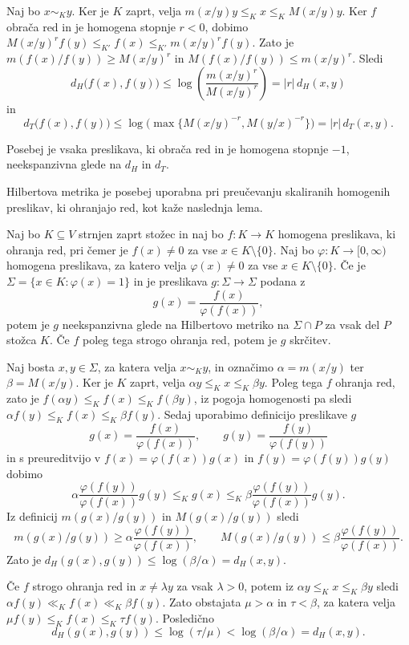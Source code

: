\documentclass[mat2, tisk]{fmfdelo}
\begin{document}
\begin{dokaz}
Naj bo $x\sim_K y$. Ker je $K$ zaprt, velja
$m(x/y)y\leq_K x\leq_K M(x/y)y$. Ker $f$ obrača red in je homogena
stopnje $r<0$, dobimo
$M(x/y)^r f(y)\leq_{K'}f(x)\leq_{K'}m(x/y)^r f(y)$.
Zato je $m(f(x)/f(y))\geq M(x/y)^r$ in
$M(f(x)/f(y))\leq m(x/y)^r$. Sledi
\[
d_H\bigl(f(x),f(y)\bigr)
\leq
\log\left(\frac{m(x/y)^r}{M(x/y)^r}\right)
=
|r|\,d_H(x,y)
\]
in
\[
d_T\bigl(f(x),f(y)\bigr)
\leq
\log\bigl(\max\{M(x/y)^{-r},M(y/x)^{-r}\}\bigr)
=
|r|\,d_T(x,y).
\]
\end{dokaz}

Posebej je vsaka preslikava, ki obrača red in je homogena stopnje
$-1$, neekspanzivna glede na $d_H$ in $d_T$.

Hilbertova metrika je posebej uporabna pri preučevanju skaliranih
homogenih preslikav, ki ohranjajo red, kot kaže naslednja lema.

\begin{lema}
Naj bo $K\subseteq V$ strnjen zaprt stožec in naj bo
$f:K\longrightarrow K$ homogena preslikava, ki ohranja red, pri čemer
je $f(x)\neq0$ za vse $x\in K\setminus\{0\}$. Naj bo
$\varphi:K\longrightarrow[0,\infty)$ homogena preslikava, za katero
velja $\varphi(x)\neq0$ za vse $x\in K\setminus\{0\}$. Če je
$\Sigma=\{x\in K:\varphi(x)=1\}$ in je preslikava
$g:\Sigma\longrightarrow\Sigma$ podana z
\[
g(x)=\frac{f(x)}{\varphi(f(x))},
\]
potem je $g$ neekspanzivna glede na Hilbertovo metriko na
$\Sigma\cap P$ za vsak del $P$ stožca $K$. Če $f$ poleg tega strogo
ohranja red, potem je $g$ skrčitev.
\end{lema}

\begin{dokaz}
Naj bosta $x,y\in\Sigma$, za katera velja $x\sim_K y$, in označimo
$\alpha=m(x/y)$ ter $\beta=M(x/y)$. Ker je $K$ zaprt, velja
$\alpha y\leq_K x\leq_K\beta y$. Poleg  tega $f$ ohranja red, zato je
$f(\alpha y)\leq_K f(x)\leq_K f(\beta y)$, iz pogoja homogenosti pa sledi
$\alpha f(y)\leq_K f(x)\leq_K\beta f(y)$. Sedaj uporabimo definicijo 
preslikave $g$ 
\[
g(x)=\frac{f(x)}{\varphi(f(x))},
\qquad
g(y)=\frac{f(y)}{\varphi(f(y))}
\]
in s preureditvijo v $f(x)= \varphi(f(x)) g(x)$ in $f(y)= \varphi(f(y)) g(y)$ dobimo
\[
\alpha\frac{\varphi(f(y))}{\varphi(f(x))}g(y)
\leq_K g(x)
\leq_K
\beta\frac{\varphi(f(y))}{\varphi(f(x))}g(y).
\]
Iz definicij $m(g(x)/g(y))$ in $M(g(x)/g(y))$ sledi
\[
m(g(x)/g(y))\geq \alpha\frac{\varphi(f(y))}{\varphi(f(x))},
\qquad
M(g(x)/g(y))\leq \beta\frac{\varphi(f(y))}{\varphi(f(x))}.
\]
Zato je $d_H(g(x),g(y))\leq\log(\beta/\alpha)=d_H(x,y)$.

Če $f$ strogo ohranja red in $x\neq\lambda y$ za vsak $\lambda>0$,
potem iz $\alpha y\leq_K x\leq_K\beta y$ sledi
$\alpha f(y)\ll_K f(x)\ll_K\beta f(y)$.
Zato obstajata $\mu>\alpha$ in $\tau<\beta$, za katera velja
$\mu f(y)\leq_K f(x)\leq_K\tau f(y)$. Posledično
\[
d_H(g(x),g(y))
\leq\log(\tau/\mu)
<
\log(\beta/\alpha)
=
d_H(x,y).
\]
\end{dokaz}
\end{document}

